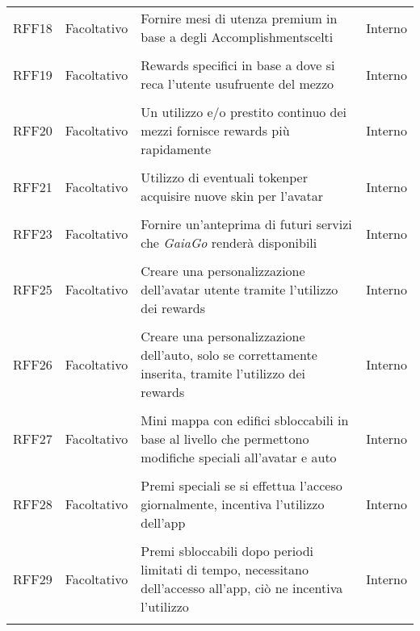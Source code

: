 \begin{longtable}{ >{\centering}p{} >{\centering}p{}
		>{\raggedright}p{} >{\centering}p{}}
	RFF18	&	Facoltativo	& Fornire mesi di utenza premium in base a degli Accomplishment\glosp scelti &	Interno  \\ 	\tabularnewline
	RFF19	&	Facoltativo	& Rewards specifici in base a dove si reca l'utente usufruente del mezzo &	Interno  \\ 	\tabularnewline
	RFF20	&	Facoltativo	& Un utilizzo e/o prestito continuo dei mezzi fornisce rewards più rapidamente &	Interno  \\ 	\tabularnewline
	RFF21	&	Facoltativo	& Utilizzo di eventuali token\glosp per acquisire nuove skin per l'avatar  &	Interno  \\ 	\tabularnewline
	RFF23	&	Facoltativo	& Fornire un'anteprima di futuri servizi che \textit{GaiaGo} renderà disponibili  &	Interno  \\ 	\tabularnewline
	RFF25	&	Facoltativo	& Creare una personalizzazione dell'avatar utente tramite l'utilizzo dei rewards  &	Interno  \\ 	\tabularnewline
	RFF26	&	Facoltativo	& Creare una personalizzazione dell'auto, solo se correttamente inserita, tramite l'utilizzo dei rewards  &	Interno  \\ 	\tabularnewline
	RFF27	&	Facoltativo	& Mini mappa con edifici sbloccabili in base al livello che permettono modifiche speciali all'avatar e auto  &	Interno  \\ 	\tabularnewline
	RFF28	&	Facoltativo	& Premi speciali se si effettua l'acceso giornalmente, incentiva l'utilizzo dell'app  &	Interno  \\ 	\tabularnewline
	RFF29	&	Facoltativo	& Premi sbloccabili dopo periodi limitati di tempo, necessitano dell'accesso all'app, ciò ne incentiva l'utilizzo  &	Interno  \\ 	\tabularnewline

\end{longtable}
